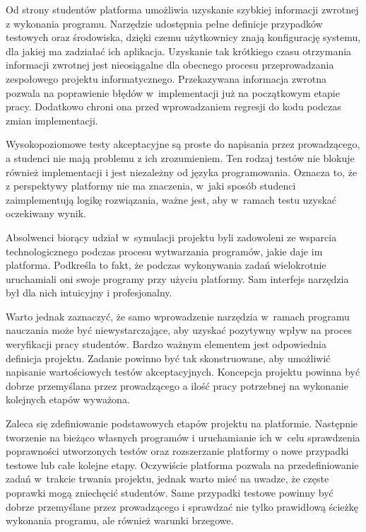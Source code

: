 Od strony studentów platforma umożliwia uzyskanie szybkiej informacji zwrotnej z wykonania programu.
Narzędzie udostępnia pełne definicje przypadków testowych oraz środowiska, dzięki czemu użytkownicy znają konfigurację systemu, dla jakiej ma zadziałać ich aplikacja.
Uzyskanie tak krótkiego czasu otrzymania informacji zwrotnej jest nieosiągalne dla obecnego procesu przeprowadzania zespołowego projektu informatycznego.
Przekazywana informacja zwrotna pozwala na poprawienie błędów w~implementacji już na początkowym etapie pracy.
Dodatkowo chroni ona przed wprowadzaniem regresji do kodu podczas zmian implementacji.

Wysokopoziomowe testy akceptacyjne są proste do napisania przez prowadzącego, a studenci nie mają problemu z ich zrozumieniem.
Ten rodzaj testów nie blokuje również implementacji i jest niezależny od języka programowania.
Oznacza to, że z perspektywy platformy nie ma znaczenia, w~jaki sposób studenci zaimplementują logikę rozwiązania, ważne jest, aby w~ramach testu uzyskać oczekiwany wynik.

Absolwenci biorący udział w~symulacji projektu byli zadowoleni ze wsparcia technologicznego podczas procesu wytwarzania programów, jakie daje im platforma.
Podkreśla to fakt, że podczas wykonywania zadań wielokrotnie uruchamiali oni swoje programy przy użyciu platformy.
Sam interfejs narzędzia był dla nich intuicyjny i profesjonalny.

Warto jednak zaznaczyć, że samo wprowadzenie narzędzia w~ramach programu nauczania może być niewystarczające, aby uzyskać pozytywny wpływ na proces weryfikacji pracy studentów.
Bardzo ważnym elementem jest odpowiednia definicja projektu.
Zadanie powinno być tak skonstruowane, aby umożliwić napisanie wartościowych testów akceptacyjnych.
Koncepcja projektu powinna być dobrze przemyślana przez prowadzącego a ilość pracy potrzebnej na wykonanie kolejnych etapów wyważona.

Zaleca się zdefiniowanie podstawowych etapów projektu na platformie.
Następnie tworzenie na bieżąco własnych programów i uruchamianie ich w~celu sprawdzenia poprawności utworzonych testów oraz rozszerzanie platformy o nowe przypadki testowe lub całe kolejne etapy.
Oczywiście platforma pozwala na przedefiniowanie zadań w~trakcie trwania projektu, jednak warto mieć na uwadze, że częste poprawki mogą zniechęcić studentów.
Same przypadki testowe powinny być dobrze przemyślane przez prowadzącego i sprawdzać nie tylko prawidłową ścieżkę wykonania programu, ale również warunki brzegowe.


